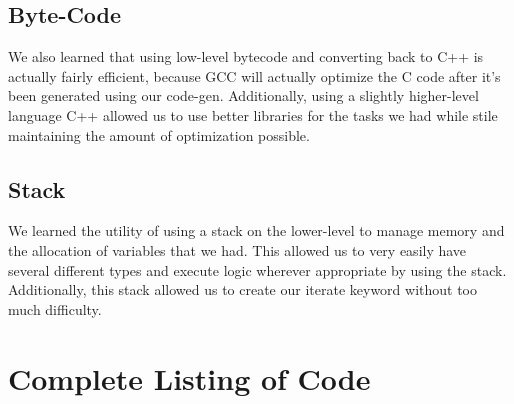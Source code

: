 \documentclass[12pt]{article}
\begin{document}
\subsection{Byte-Code}
We also learned that using low-level bytecode and converting back to C++ is actually fairly efficient, because GCC will actually optimize the C code after it's been generated using our code-gen.  Additionally, using a slightly higher-level language C++ allowed us to use better libraries for the tasks we had while stile maintaining the amount of optimization possible.

\subsection{Stack}
We learned the utility of using a stack on the lower-level to manage memory and the allocation of variables that we had.  This allowed us to very easily have several different types and execute logic wherever appropriate by using the stack.  Additionally, this stack allowed us to create our iterate keyword without too much difficulty.

\section{Complete Listing of Code}
\end{document}
